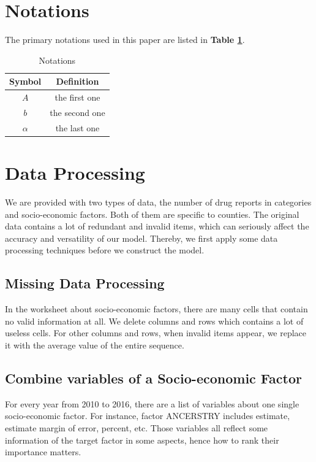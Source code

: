 \documentclass[11pt]{article}
\begin{document}
\section{Notations}
The primary notations used in this paper are listed in \textbf{Table \ref{tb:notation}}.
\begin{table}[!htbp]
\begin{center}
\caption{Notations}
\begin{tabular}{cc}
	\toprule
	\multicolumn{1}{m{3cm}}{\centering Symbol}
	&\multicolumn{1}{m{8cm}}{\centering Definition}\\
	\midrule
	$A$&the first one\\
	$b$&the second one\\
	$\alpha$ &the last one\\
	\bottomrule
\end{tabular}\label{tb:notation}
\end{center}
\end{table}

\section{Data Processing}
We are provided with two types of data, the number of drug reports in categories and socio-economic factors. Both of them are specific to counties. The original data contains a lot of redundant and invalid items, which can seriously affect the accuracy and versatility of our model. Thereby, we first apply some data processing techniques before we construct the model.

\subsection{Missing Data Processing}
In the worksheet about socio-economic factors, there are many cells that contain no valid information at all. We delete columns and rows which contains a lot of useless cells. For other columns and rows, when invalid items appear, we replace it with the average value of the entire sequence.

\subsection{Combine variables of a Socio-economic Factor}
For every year from 2010 to 2016, there are a list of variables about one single socio-economic factor. For instance, factor ANCERSTRY includes estimate, estimate margin of error, percent, etc. Those variables all reflect some information of the target factor in some aspects, hence how to rank their importance matters. 
\end{document}
